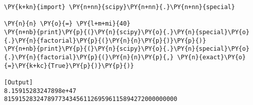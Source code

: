 \begin{Verbatim}[label=\makebox{\href{https://bitbucket.org/lbaldini/statnotes/src/master/snippets/scipy.special.factorial.py}{https://bitbucket.org/.../scipy.special.factorial.py}},commandchars=\\\{\}]
\PY{k+kn}{import} \PY{n+nn}{scipy}\PY{n+nn}{.}\PY{n+nn}{special}

\PY{n}{n} \PY{o}{=} \PY{l+m+mi}{40}
\PY{n+nb}{print}\PY{p}{(}\PY{n}{scipy}\PY{o}{.}\PY{n}{special}\PY{o}{.}\PY{n}{factorial}\PY{p}{(}\PY{n}{n}\PY{p}{)}\PY{p}{)}
\PY{n+nb}{print}\PY{p}{(}\PY{n}{scipy}\PY{o}{.}\PY{n}{special}\PY{o}{.}\PY{n}{factorial}\PY{p}{(}\PY{n}{n}\PY{p}{,} \PY{n}{exact}\PY{o}{=}\PY{k+kc}{True}\PY{p}{)}\PY{p}{)}

[Output]
8.15915283247898e+47
815915283247897734345611269596115894272000000000
\end{Verbatim}
